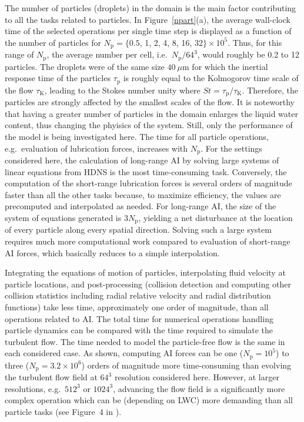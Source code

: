 \documentclass[../thesis.tex]{subfiles}
\begin{document}
The number of particles (droplets) in the domain is the main factor contributing to all the tasks related to particles. In Figure~\ref{npart}(a), the average wall-clock time of the selected operations per single time step is displayed as a function of the number of particles for $N_\text{p}=\{0.5$, 1, 2, 4, 8, 16, 32$\}\times10^5$. Thus, for this range of $N_\text{p}$, the average number per cell, i.e.\ $N_\text{p}/64^3$, would roughly be 0.2 to 12 particles. The droplets were of the same size $40~\mu$m for which the inertial response time of the particles $\tau_\text{p}$ is roughly equal to the Kolmogorov time scale of the flow $\tau_\text{K}$, leading to the Stokes number unity where $St = \tau_\text{p}/\tau_\text{K}$. Therefore, the particles are strongly affected by the smallest scales of the flow. It is noteworthy that having a greater number of particles in the domain enlarges the liquid water content, thus changing the phyisics of the system. Still, only the performance of the model is being investigated here. The time for all particle operations, e.g.~evaluation of lubrication forces, increases with $N_\text{p}$. For the settings considered here, the calculation of long-range AI by solving large systems of linear equations from HDNS is the most time-consuming task. Conversely, the computation of the short-range lubrication forces is several orders of magnitude faster than all the other tasks because, to maximize efficiency, the values are precomputed and interpolated as needed. For long-range AI, the size of the system of equations generated is $3N_\text{p}$, yielding a net disturbance at the location of every particle along every spatial direction. Solving such a large system requires much more computational work compared to evaluation of short-range AI forces, which basically reduces to a simple interpolation.

Integrating the equations of motion of particles, interpolating fluid velocity at particle locations, and post-processing (collision detection and computing other collision statistics including radial relative velocity and radial distribution functions) take less time, approximately one order of magnitude, than all operations related to AI. The total time for numerical operations handling particle dynamics can be compared with the time required to simulate the turbulent flow. The time needed to model the particle-free flow is the same in each considered case. As shown, computing AI forces can be one ($N_\text{p}=10^5$) to three ($N_\text{p}=3.2\times10^6$) orders of magnitude more time-consuming than evolving the turbulent flow field at $64^3$ resolution considered here. However, at larger resolutions, e.g.~$512^3$ or $1024^3$, advancing the flow field is a significantly more complex operation which can be (depending on LWC) more demanding than all particle tasks (see Figure~4 in \cite{APCRW14}).
\end{document}
